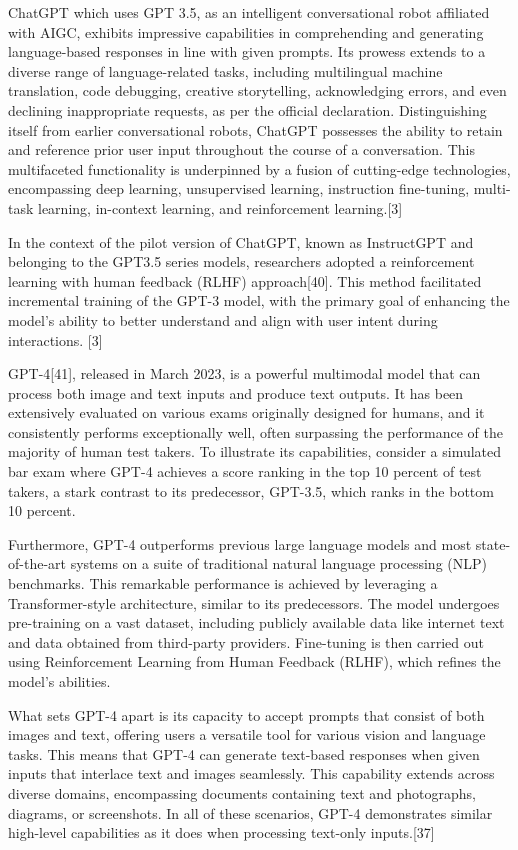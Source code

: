 \documentclass[conference]{IEEEtran}
\begin{document}
ChatGPT which uses GPT 3.5, as an intelligent conversational robot affiliated with AIGC, exhibits impressive capabilities in comprehending and generating language-based responses in line with given prompts. Its prowess extends to a diverse range of language-related tasks, including multilingual machine translation, code debugging, creative storytelling, acknowledging errors, and even declining inappropriate requests, as per the official declaration. Distinguishing itself from earlier conversational robots, ChatGPT possesses the ability to retain and reference prior user input throughout the course of a conversation. This multifaceted functionality is underpinned by a fusion of cutting-edge technologies, encompassing deep learning, unsupervised learning, instruction fine-tuning, multi-task learning, in-context learning, and reinforcement learning.[3]

In the context of the pilot version of ChatGPT, known as InstructGPT and belonging to the GPT3.5 series models, researchers adopted a reinforcement learning with human feedback (RLHF) approach[40]. This method facilitated incremental training of the GPT-3 model, with the primary goal of enhancing the model's ability to better understand and align with user intent during interactions. [3]

GPT-4[41], released in March 2023, is a powerful multimodal model that can process both image and text inputs and produce text outputs. It has been extensively evaluated on various exams originally designed for humans, and it consistently performs exceptionally well, often surpassing the performance of the majority of human test takers. To illustrate its capabilities, consider a simulated bar exam where GPT-4 achieves a score ranking in the top 10 percent of test takers, a stark contrast to its predecessor, GPT-3.5, which ranks in the bottom 10 percent.

Furthermore, GPT-4 outperforms previous large language models and most state-of-the-art systems on a suite of traditional natural language processing (NLP) benchmarks. This remarkable performance is achieved by leveraging a Transformer-style architecture, similar to its predecessors. The model undergoes pre-training on a vast dataset, including publicly available data like internet text and data obtained from third-party providers. Fine-tuning is then carried out using Reinforcement Learning from Human Feedback (RLHF), which refines the model's abilities.

What sets GPT-4 apart is its capacity to accept prompts that consist of both images and text, offering users a versatile tool for various vision and language tasks. This means that GPT-4 can generate text-based responses when given inputs that interlace text and images seamlessly. This capability extends across diverse domains, encompassing documents containing text and photographs, diagrams, or screenshots. In all of these scenarios, GPT-4 demonstrates similar high-level capabilities as it does when processing text-only inputs.[37]
\end{document}
